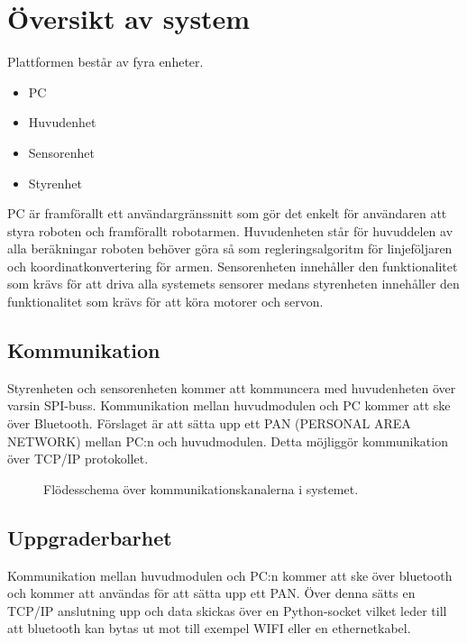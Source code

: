 \section{Översikt av system}
Plattformen består av fyra enheter. 
\begin{itemize}
\item{PC}
\item{Huvudenhet}
\item{Sensorenhet}
\item{Styrenhet}
\end{itemize}

PC är framförallt ett användargränssnitt som gör det enkelt för användaren att styra roboten och framförallt robotarmen. Huvudenheten står för huvuddelen av alla beräkningar roboten behöver göra så som regleringsalgoritm för linjeföljaren och koordinatkonvertering för armen. Sensorenheten innehåller den funktionalitet som krävs för att driva alla systemets sensorer medans styrenheten innehåller den funktionalitet som krävs för att köra motorer och servon.

\subsection{Kommunikation}
Styrenheten och sensorenheten kommer att kommuncera med huvudenheten över varsin SPI-buss. Kommunikation mellan huvudmodulen och PC kommer att ske över Bluetooth. Förslaget är att sätta upp ett PAN (PERSONAL AREA NETWORK) mellan PC:n och huvudmodulen. Detta möjliggör kommunikation över TCP/IP protokollet.

\begin{figure}[h]
\center
\scalebox{0.6}{}
\caption{Flödesschema över kommunikationskanalerna i systemet.}
\end{figure}

\subsection{Uppgraderbarhet}
Kommunikation mellan huvudmodulen och PC:n kommer att ske över bluetooth och kommer att användas för att sätta upp ett PAN. Över denna sätts en TCP/IP anslutning upp och data skickas över en Python-socket vilket leder till att bluetooth kan bytas ut mot till exempel WIFI eller en ethernetkabel.
